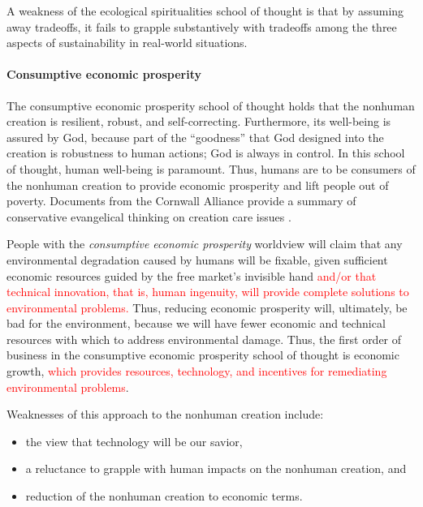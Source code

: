 \documentclass[12pt]{article}
\newcommand{\ins}[1]{\textcolor{red}{#1}}
\begin{document}
A weakness of the ecological spiritualities school of thought
is that by assuming away tradeoffs,
it fails to grapple substantively with tradeoffs
among the three aspects of sustainability
in real-world situations.


\paragraph{Consumptive economic prosperity} 
\label{sec:consumptive_economic_prosperity}

The consumptive economic prosperity school of thought 
holds that the nonhuman creation is resilient, robust, and self-correcting.
Furthermore, its well-being is assured by God, 
because part of the ``goodness'' that God designed into the creation
is robustness to human actions; 
God is always in control.
In this school of thought, human well-being is paramount. 
Thus, humans are to be consumers of the nonhuman creation 
to provide economic prosperity and
lift people out of poverty.
Documents from the Cornwall Alliance 
provide a summary of conservative evangelical thinking on creation care issues
\autocite{Cornwall:2006aa}.

People with the \emph{consumptive economic prosperity} worldview
will claim that any environmental degradation caused by humans will be fixable,
given sufficient economic resources guided by the free market's invisible hand
\ins{and/or that technical innovation, that is, human ingenuity, will provide complete solutions to environmental problems.}
Thus, reducing economic prosperity will, ultimately, be bad for the environment, because
we will have fewer economic and technical resources with which to address environmental damage.
Thus, the first order of business in the consumptive economic prosperity school of thought
is economic growth, \ins{which provides resources, technology, and incentives for remediating environmental problems}. 

Weaknesses of this approach to the nonhuman creation include:
%
\begin{itemize}

\item the view that technology will be our savior, 
  \item a reluctance to grapple with human impacts on the nonhuman creation, and 

  \item reduction of the nonhuman creation to economic terms.

\end{itemize}
\end{document}
